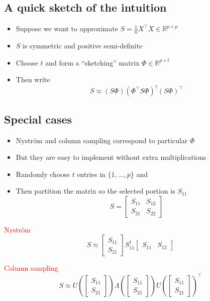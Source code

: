 \documentclass[]{article}
\renewcommand{\sout}[1]{\textcolor{red}{#1}}
\begin{document}
\hypertarget{a-quick-sketch-of-the-intuition}{%
\subsection{A quick sketch of the
intuition}\label{a-quick-sketch-of-the-intuition}}

\begin{itemize}
\item
  Suppose we want to approximate
  \(S=\frac{1}{n}X^\top X \in \mathbb{R}^{p\times p}\)
\item
  \(S\) is symmetric and positive semi-definite
\item
  Choose \(t\) and form a ``sketching'' matrix
  \(\Phi \in \mathbb{R}^{p\times t}\)
\item
  Then write \[
  S \approx (S\Phi) (\Phi^\top S \Phi)^\dagger (S\Phi)^\top
  \]
\end{itemize}

\hypertarget{special-cases}{%
\subsection{Special cases}\label{special-cases}}

\begin{itemize}
\item
  Nyström and column sampling correspond to particular \(\Phi\)
\item
  But they are easy to implement without extra multiplications
\item
  Randomly choose \(t\) entries in \(\{1,\ldots,p\}\) and
\item
  Then partition the matrix so the selected portion is \(S_{11}\) \[
  S = \begin{bmatrix} S_{11} & S_{12}\\ S_{21} & S_{22}\end{bmatrix}
  \]
\end{itemize}

\sout{Nyström} \[
S \approx \begin{bmatrix} S_{11} \\ S_{21} \end{bmatrix}
S_{11}^\dagger \begin{bmatrix}S_{11} & S_{12}\end{bmatrix}
\]

\sout{Column sampling} \[
S \approx U\left(\begin{bmatrix} S_{11} \\
    S_{21} \end{bmatrix}\right) \Lambda\left(\begin{bmatrix} S_{11}
    \\ S_{21} \end{bmatrix}\right) U \left(\begin{bmatrix} S_{11} \\
    S_{21} \end{bmatrix}\right)^\top 
\]
\end{document}
